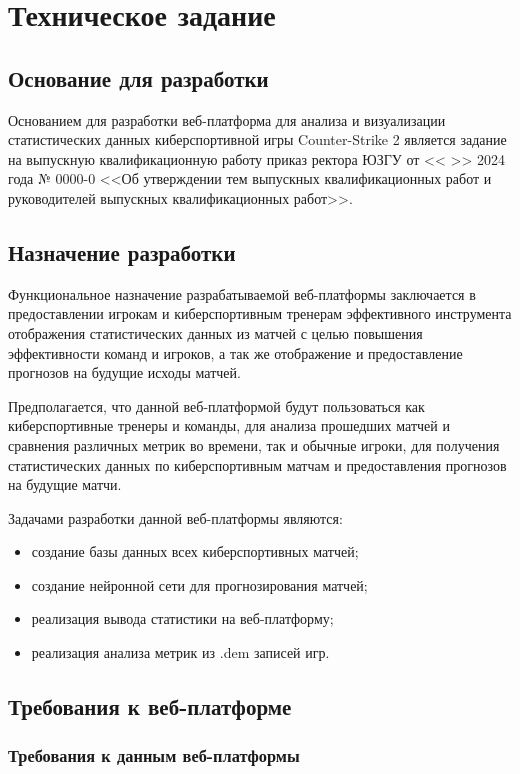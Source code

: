\newsection
\section{Техническое задание}
\subsection{Основание для разработки}

Основанием для разработки веб-платформа для анализа и визуализации статистических данных киберспортивной игры Counter-Strike 2 является задание на выпускную квалификационную работу приказ ректора ЮЗГУ от <<  >>     2024 года № 0000-0 <<Об утверждении тем выпускных квалификационных работ и руководителей выпускных квалификационных работ>>.

\subsection{Назначение разработки}

Функциональное назначение разрабатываемой веб-платформы заключается в предоставлении игрокам и киберспортивным тренерам эффективного инструмента отображения статистических данных из матчей с целью повышения эффективности команд и игроков, а так же отображение и предоставление прогнозов на будущие исходы матчей.

Предполагается, что данной веб-платформой будут пользоваться как киберспортивные тренеры и команды, для анализа прошедших матчей и сравнения различных метрик во времени, так и обычные игроки, для получения статистических данных по киберспортивным матчам и предоставления прогнозов на будущие матчи.

Задачами разработки данной веб-платформы являются:
\begin{itemize}
	\item создание базы данных всех киберспортивных матчей;
	\item создание нейронной сети для прогнозирования матчей;
	\item реализация вывода статистики на веб-платформу;
	\item реализация анализа метрик из .dem записей игр.
\end{itemize}

\subsection{Требования к веб-платформе}
\subsubsection{Требования к данным веб-платформы}

